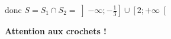 \begin{enumerate}
\begin{enumerate}
donc $S=S_1 \cap S_2 = \left]-\infty;-\frac{1}{3}  \right] \cup \left[2;+\infty \right[ $

\textbf{Attention aux crochets !}
\end{enumerate}

\end{enumerate}
